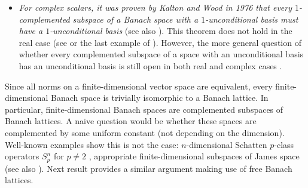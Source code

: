 \documentclass[11pt]{amsart}
\theoremstyle{definition}
\numberwithin{equation}{section}
\begin{document}
\begin{itemize}
    For not necessarily contractive projections, the following \textit{conjecture} deserves to be mentioned again: Is every complemented subspace of $C[0,1]$ linearly isomorphic to $C(K)$? \cite[Conjecture 5.7.8]{AK-book}.
 
    \item \textit{For complex scalars, it was proven by Kalton and Wood in 1976 \cite{KW} that every $1$-complemented subspace of a Banach space with a $1$-unconditional basis must have a $1$-unconditional basis} (see also \cite{Flinn, Rosenthal-KW}). This theorem does not hold in the real case (see \cite{BFL} or the last example of \cite{L79}). However, the more general question of whether every complemented subspace of a space with an unconditional basis has an unconditional basis is still open in both real and complex cases \cite[Problem 1.d.5]{LT1-book}.
\end{itemize}





Since all norms on a finite-dimensional vector space are equivalent, every finite-dimensional Banach space is trivially isomorphic to a Banach lattice. In particular, finite-dimensional Banach spaces are complemented subspaces of Banach lattices. A naive question would be whether these spaces are complemented by some uniform constant (not depending on the dimension). Well-known examples show this is not the case: $n$-dimensional Schatten $p$-class operators $S_p^n$ for $p\neq 2$ \cite[Theorem 5.1]{GL74}, appropriate finite-dimensional subspaces of James space \cite{JT} (see also \cite[Theorem 34.3]{TJ-book}). Next result provides a similar argument making use of free Banach lattices.
\end{document}
